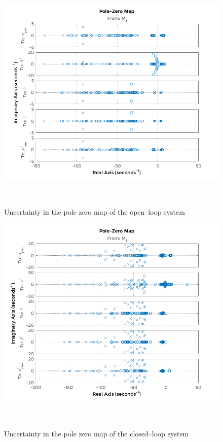 \begin{figure}[!h]
	\includegraphics[width=1.1\linewidth]{figs/06/control/pole_zero_map_uncertainty_1}
	\caption{Uncertainty in the pole zero map of the open--loop system}
	\\[-5cm]
\end{figure}
\newpage
\begin{figure}[!h]
	\includegraphics[width=1.1\linewidth]{figs/06/control/pole_zero_map_uncertainty_2}
	\caption{Uncertainty in the pole zero map of the closed--loop system}
	\\[-1cm]
\end{figure}

